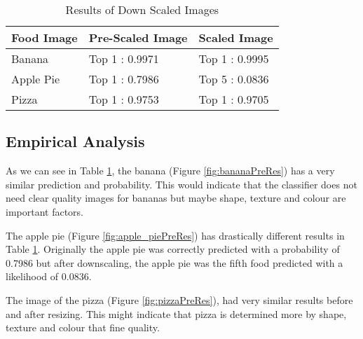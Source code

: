 \begin{table}[]
\centering
\caption{Results of Down Scaled Images}
\label{scaledImages}
\begin{tabular}{|l|l|l|}
\hline
\textbf{Food Image}& \textbf{Pre-Scaled Image} & \textbf{Scaled Image}   \\ \hline
Banana     & Top 1 : 0.9971   & Top 1 : 0.9995 \\ \hline
Apple Pie  & Top 1 : 0.7986   & Top 5 : 0.0836 \\ \hline
Pizza      & Top 1 : 0.9753   & Top 1 : 0.9705 \\ \hline
\end{tabular}
\end{table}

\subsection*{Empirical Analysis}
As we can see in Table \ref{scaledImages}, the banana (Figure \ref{fig:bananaPreRes}) has a very similar prediction and probability.
This would indicate that the classifier does not need clear quality images for bananas but maybe shape, texture and colour are important factors.

The apple pie (Figure \ref{fig:apple_piePreRes}) has drastically different results in Table \ref{scaledImages}.
Originally the apple pie was correctly predicted with a probability of 0.7986 but after downscaling, the apple pie was the fifth food predicted with a likelihood of 0.0836.

The image of the pizza (Figure \ref{fig:pizzaPreRes}), had very similar results before and after resizing.
This might indicate that pizza is determined more by shape, texture and colour that fine quality.


